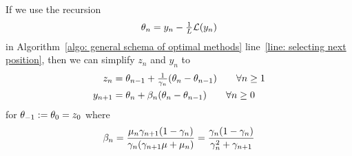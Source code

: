 \begin{lemma}\label{lem: streamline general schema of optimal methods}
	If we use the recursion
	\begin{align}\label{eq-lem-assmpt: weigth recursion}
		\theta_n = y_n - \tfrac1{L}\mathcal{L}(y_n)
	\end{align}
	in Algorithm~\ref{algo: general schema of optimal methods} line~\ref{line:
	selecting next position}, then we can simplify \(z_n\) and \(y_n\)
	to
	\begin{align}
		\label{eq: z_n recursion}
		z_n
		&= \theta_{n-1} + \tfrac1{\gamma_n}(\theta_n-\theta_{n-1})
		\qquad \forall n\ge 1\\
		y_{n+1}
		&=\theta_n + \beta_n(\theta_n-\theta_{n-1}) \qquad \forall n\ge 0
	\end{align}
	for \(\theta_{-1}:=\theta_0=z_0\) where
	\begin{align}
		\beta_n
		= \frac{\mu_n \gamma_{n+1}(1-\gamma_n)}{\gamma_n(\gamma_{n+1}\mu +\mu_n)}
		= \frac{\gamma_n(1-\gamma_n)}{\gamma_n^2 + \gamma_{n+1}}
	\end{align}
\end{lemma}
